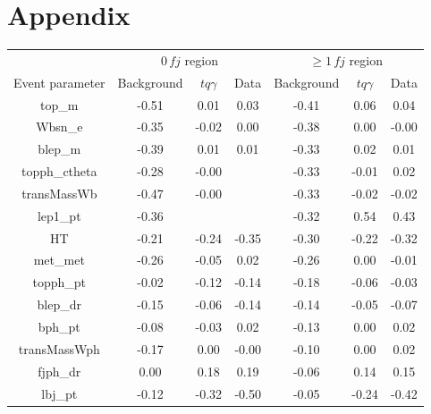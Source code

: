 \chapter{Appendix}
\begin{table}[htbp]
    \centering
    \begin{tabular}{c|c c c|c c c}
        \toprule
        {}&\multicolumn{3}{c}{$0\, fj$ region}&\multicolumn{3}{c}{$\geq 1\, fj$ region}\\
        Event parameter &  Background &  $tq\gamma$ &  Data &  Background &  $tq\gamma$ &  Data \\
        \midrule
        top\_m                            & -0.51 &      0.01 &   0.03 & -0.41 &      0.06 &   0.04 \\ \hline
        Wbsn\_e                           & -0.35 &     -0.02 &   0.00 & -0.38 &      0.00 &  -0.00 \\ \hline
        blep\_m                           & -0.39 &      0.01 &   0.01 & -0.33 &      0.02 &   0.01 \\ \hline
        topph\_ctheta                     & -0.28 &     -0.00 &     & -0.33 &     -0.01 &   0.02 \\ \hline
        transMassWb                      & -0.47 &     -0.00 &     & -0.33 &     -0.02 &  -0.02 \\ \hline
        lep1\_pt                          & -0.36 &        &     & -0.32 &      0.54 &   0.43 \\ \hline
        HT                               & -0.21 &     -0.24 &  -0.35 & -0.30 &     -0.22 &  -0.32 \\ \hline
        met\_met                          & -0.26 &     -0.05 &   0.02 & -0.26 &      0.00 &  -0.01 \\ \hline
        topph\_pt                         & -0.02 &     -0.12 &  -0.14 & -0.18 &     -0.06 &  -0.03 \\ \hline
        blep\_dr                          & -0.15 &     -0.06 &  -0.14 & -0.14 &     -0.05 &  -0.07 \\ \hline
        bph\_pt                           & -0.08 &     -0.03 &   0.02 & -0.13 &      0.00 &   0.02 \\ \hline
        transMassWph                     & -0.17 &      0.00 &  -0.00 & -0.10 &      0.00 &   0.02 \\ \hline
        fjph\_dr                          &  0.00 &      0.18 &   0.19 & -0.06 &      0.14 &   0.15 \\ \hline
        lbj\_pt                           & -0.12 &     -0.32 &  -0.50 & -0.05 &     -0.24 &  -0.42 \\ \hline

\end{tabular}
\end{table}
